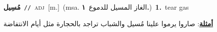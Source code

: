 \documentclass[10pt,a4paper,twoside]{article} %
\begin{document}
\begin{multicols}{2}
{\setlength\topsep{0pt}\textbf{\foreignlanguage{arabic}{مُسِيل}}\ {\color{gray}\texttt{//}\color{black}}\ \textsc{adj}\ [m.]\ \color{gray}(msa. \foreignlanguage{arabic}{الغاز المسيل للدموع}~\foreignlanguage{arabic}{\textbf{١.}})\color{black}\ \textbf{1.}~tear gas\  \begin{flushright}\color{gray}\foreignlanguage{arabic}{\textbf{\underline{\foreignlanguage{arabic}{أمثلة}}}: صاروا يرموا علينا مُسيل والشباب تراجد بالحجارة مثل أيام الانتفاضة}\end{flushright}\color{black}} \vspace{2mm}

\end{multicols}
\end{document}
